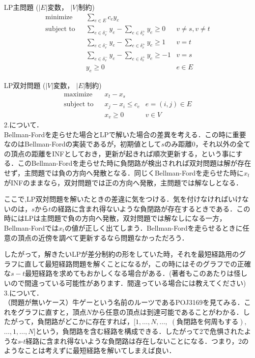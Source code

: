 \documentclass[13pt]{jarticle}
\theoremstyle{nonitalic} %
\begin{document}
LP主問題
($|E|$変数， $|V|$制約)
\begin{align}
 &&&&&\textrm{minimize}   && \sum_{e  \in E} c_e y_e \\
 &&&&&\textrm{subject to} && \sum_{e \in \delta_v^- } y_e - \sum_{e \in \delta_v^+} y_e \geq 0 & v\neq s, v\neq t  &&&&&\\
 &&&&&                    && \sum_{e \in \delta_v^- } y_e - \sum_{e \in \delta_v^+} y_e \geq 1 & v = t  &&&&&\\
 &&&&&                    && \sum_{e \in \delta_v^- } y_e - \sum_{e \in \delta_v^+} y_e \geq -1 & v = s  &&&&&\\
 &&&&&                    &&  y_e \geq 0 & e \in E&&&&&
\end{align}

LP双対問題
($|V|$変数， $|E|$制約)
\begin{align}
 &&&&&\textrm{maximize}   && x_t - x_s \\
 &&&&&\textrm{subject to} && x_j - x_i\leq c_e & e = (i,j) \in E  &&&&&\\
 &&&&&                    && x_v \geq 0 & v \in V &&&&&
\end{align}
2.について．\\
 Bellman-Fordを走らせた場合とLPで解いた場合の差異を考える．この時に重要なのはBellman-Fordの実装であるが，初期値として$s$のみ距離$0$，それ以外の全ての頂点の距離をINFとしておき，更新が起きれば順次更新する，という事にする．このBellman-Fordを走らせた時に負閉路が検出されれば双対問題は解が存在せず，主問題では負の方向へ発散となる．同じくBellman-Fordを走らせた時に$x_t$がINFのままなら，双対問題では正の方向へ発散，主問題では解なしとなる．

ここで,LP双対問題を解いたときの差違に気をつける．気を付けなければいけないのは，$s$から$t$の経路に含まれ得ないような負閉路が存在するときである．この時にはLPは主問題で負の方向へ発散，双対問題では解なしになる一方，Bellman-Fordでは$x_t$の値が正しく出てしまう．Bellman-Fordを走らせるときに任意の頂点の近傍を調べて更新するなら問題なかっただろう．

したがって，解きたいLPが差分制約の形をしていた時，それを最短経路用のグラフに直して最短経路問題を解くことになるが，この時にはそのグラフでの正確な$s-t$最短経路を求めてもおかしくなる場合がある．(著者もこのあたりは怪しいので間違っている可能性があります．間違っている場合には教えてください)\\

3.について．\\

（問題が無いケース）牛ゲーという名前のルーツであるPOJ3169を見てみる．これをグラフに直すと，頂点$N$から任意の頂点は到達可能であることがわかる．したがって，負閉路がどこかに存在すれば，[$1, \dots ,N,\dots,$ $ ( \textrm{負閉路を何周もする} ),$ $\dots ,1, \dots, N$]という，負閉路を含む経路を構成できる．したがって2で危惧されたような$s$-$t$経路に含まれ得ないような負閉路は存在しないことになる．つまり，2のようなことは考えずに最短経路を解いてしまえば良い．
\end{document}
